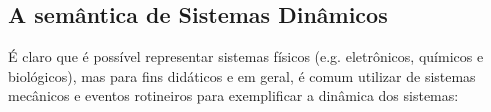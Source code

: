 \subsection{A semântica de Sistemas Dinâmicos}
\label{sec:semantica}

É claro que é possível representar sistemas físicos (e.g. eletrônicos, químicos e biológicos), mas para fins didáticos e em geral, é comum utilizar de sistemas mecânicos e eventos rotineiros para exemplificar a dinâmica dos sistemas:

